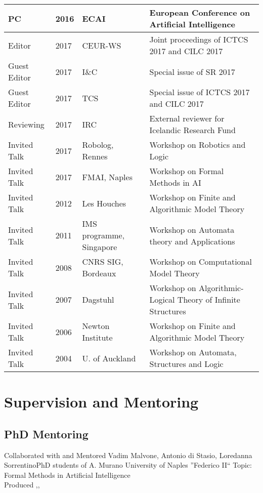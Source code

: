 \documentclass[10pt,a4paper,sans]{moderncv}
\begin{document}
\begin{tabular}{|l|l|l|l|}
 PC & 2016  & ECAI & European Conference on Artificial Intelligence\\
 \hline
 Editor & 2017& CEUR-WS & Joint proceedings of ICTCS 2017 and CILC 2017\\
\hline 
 Guest Editor & 2017& I\&C  & Special issue of SR 2017 \\
 Guest Editor & 2017  & TCS & Special issue of ICTCS 2017 and CILC 2017 \\
 \hline
 Reviewing & 2017 & IRC & External reviewer for Icelandic Research Fund\\
 \hline 
 Invited Talk & 2017 & Robolog, Rennes & Workshop on Robotics and Logic\\
 Invited Talk & 2017 & FMAI, Naples & Workshop on Formal Methods in AI\\
 Invited Talk & 2012 & Les Houches & Workshop on Finite and Algorithmic Model Theory\\
 Invited Talk & 2011 & IMS programme, Singapore & Workshop on Automata theory and Applications\\
 Invited Talk & 2008 & CNRS SIG, Bordeaux & Workshop on Computational Model Theory\\
 Invited Talk & 2007 & Dagstuhl& Workshop on Algorithmic-Logical Theory of Infinite Structures\\
 Invited Talk & 2006 & Newton Institute& Workshop on Finite and Algorithmic Model Theory\\
 Invited Talk & 2004 & U. of Auckland & Workshop on Automata, Structures and Logic\\
 \hline
 \end{tabular}

 

\section{Supervision and Mentoring}


 
\subsection{PhD Mentoring}
{Collaborated with and Mentored Vadim Malvone, Antonio di Stasio, Loredanna Sorrentino}{PhD students of A. Murano}
{University of Naples ''Federico II``}{}
{Topic: Formal Methods in Artificial Intelligence\\Produced {},,}{}
\end{document}
